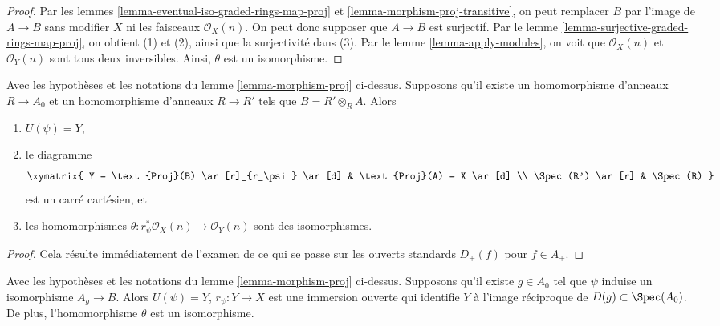 \begin{proof}
Par les lemmes \ref{lemma-eventual-iso-graded-rings-map-proj} et
\ref{lemma-morphism-proj-transitive},
on peut remplacer $B$ par l'image de $A \to B$
sans modifier $X$ ni les faisceaux $\mathcal{O}_X(n)$.
On peut donc supposer que $A \to B$ est surjectif. Par le
lemme \ref{lemma-surjective-graded-rings-map-proj}, on obtient (1) et (2),
ainsi que la surjectivité dans (3).
Par le lemme \ref{lemma-apply-modules}, on voit que
$\mathcal{O}_X(n)$ et $\mathcal{O}_Y(n)$
sont tous deux inversibles. Ainsi, $\theta$ est un isomorphisme.
\end{proof}

\begin{lemma}
\label{lemma-base-change-map-proj}
\begin{reference}
\cite[II, Proposition 2.8.10]{EGA}
\end{reference}
Avec les hypothèses et les notations du lemme \ref{lemma-morphism-proj} ci-dessus.
Supposons qu'il existe un homomorphisme d'anneaux $R \to A_0$ et un homomorphisme d'anneaux
$R \to R'$ tels que $B = R' \otimes_R A$. Alors
\begin{enumerate}
\item $U(\psi) = Y$,
\item le diagramme
$$
\xymatrix{
Y = \text{Proj}(B) \ar[r]_{r_\psi} \ar[d] &
\text{Proj}(A) = X \ar[d] \\
\Spec(R') \ar[r] &
\Spec(R)
}
$$
est un carré cartésien, et
\item les homomorphismes $\theta : r_\psi^*\mathcal{O}_X(n) \to \mathcal{O}_Y(n)$
sont des isomorphismes.
\end{enumerate}
\end{lemma}

\begin{proof}
Cela résulte immédiatement de l'examen de ce qui se passe sur les ouverts
standards $D_{+}(f)$ pour $f \in A_{+}$.
\end{proof}

\begin{lemma}
\label{lemma-localization-map-proj}
Avec les hypothèses et les notations du lemme \ref{lemma-morphism-proj} ci-dessus.
Supposons qu'il existe $g \in A_0$ tel que $\psi$ induise un
isomorphisme $A_g \to B$. Alors
$U(\psi) = Y$, $r_\psi : Y \to X$ est une immersion ouverte
qui identifie $Y$ à l'image réciproque
de $D(g) \subset \Spec(A_0)$. De plus, l'homomorphisme $\theta$
est un isomorphisme.
\end{lemma}

